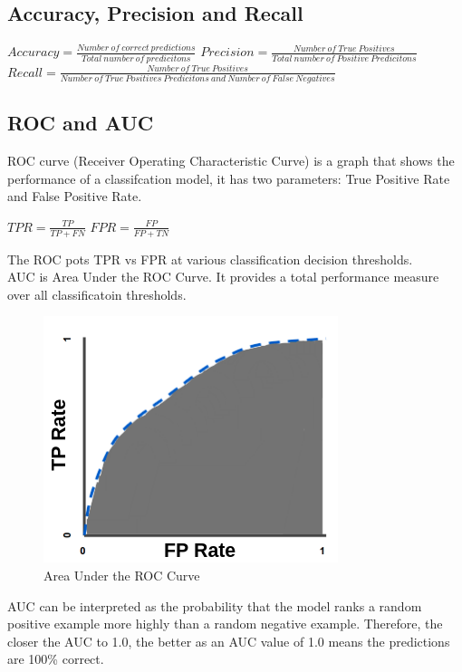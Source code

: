 \documentclass[12pt]{article}
\begin{document}
\subsection{Accuracy, Precision and Recall}
\begin{center}
\begin{Large}
$Accuracy = \frac{Number\ of\ correct\ predictions}{Total\ number \ of\ predicitons}$
\linebreak\linebreak
$Precision = \frac{Number\ of\ True\ Positives}{Total\ number \ of\ Positive\ Predicitons}$
\linebreak\linebreak
$Recall = \frac{Number\ of\ True\ Positives}{Number \ of\ True \ Positives\ Predicitons\ and\ Number\ of\ False\ Negatives}$
\end{Large}
\end{center}

\subsection{ROC and AUC}
ROC curve (Receiver Operating Characteristic Curve) is a graph that shows the performance of a classifcation model, it has two parameters: True Positive Rate and False Positive Rate.
\begin{center}
\begin{Large}
$TPR = \frac{TP}{TP + FN}$
\linebreak\linebreak
$FPR = \frac{FP}{FP + TN}$
\end{Large}
\end{center}
The ROC pots TPR vs FPR at various classification decision thresholds.
\\ AUC is Area Under the ROC Curve. It provides a total performance measure over all classificatoin thresholds.
\begin{figure}[H]
	\includegraphics[scale = 0.5]{imgs/AUC.png}
	\centering
	\caption{Area Under the ROC Curve}
\end{figure}
AUC can be interpreted as the probability that the model ranks a random positive example more highly than a random negative example. Therefore, the closer the AUC to 1.0, the better as an AUC value of 1.0 means the predictions are 100\% correct.
\end{document}
